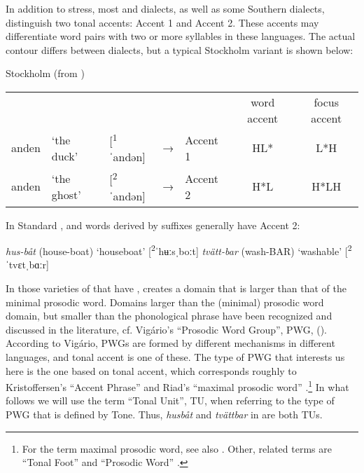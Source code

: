 \documentclass[output=paper]{LSP/langsci}
\begin{document}
In addition to stress, most  and  dialects, as well as some Southern  dialects, distinguish two tonal accents:  Accent 1 and Accent 2. These accents may differentiate word pairs with two or more syllables in these languages. The actual  contour differs between dialects, but a typical Stockholm variant is shown below:

\ea%
\label{ex:erteschik:3}
 Stockholm  (from \citealt[184]{Riad2013})\\
 \begin{tabular}[t]{lllllcc}
 & & & & &  word accent & focus accent\\
 anden & ‘the duck’  & [\textsuperscript{1}ˈandən]   & → & Accent 1 & HL*       &      L*H\\
 anden & ‘the ghost’ & [\textsuperscript{2}ˈandən]   & → & Accent 2 & H*L       &      H*LH\\ 
 \end{tabular}
\z

In Standard ,  and words derived by suffixes generally have Accent 2:

\ea%
\label{ex:erteschik:4}
\ea \label{ex:erteschik:4a} \textit{hus-båt} (house-boat) ‘houseboat’      [\textsuperscript{2}ˈhʉːsˌboːt]
\ex \label{ex:erteschik:4b} \textit{tvätt-bar} (wash-BAR) ‘washable’       [\textsuperscript{2}ˈtvɛtˌbɑːr]
\z
\z

In those varieties of  that have ,  creates a domain that is larger than that of the minimal prosodic word. Domains larger than the (minimal) prosodic word domain, but smaller than the phonological phrase have been recognized and discussed in the literature, cf. Vigário’s ``Prosodic Word Group'', PWG, (\citealt{Vigário2010}). According to Vigário, PWGs are formed by different mechanisms in different languages, and tonal accent is one of these. The type of PWG that interests us here is the one based on tonal accent, which corresponds roughly to Kristoffersen’s ``Accent Phrase'' \citep{Kristoffersen2000} and Riad’s ``maximal prosodic word'' \citep{Riad2013}.\footnote{For the term maximal prosodic word, see also  \citet{Myrberg2013}. Other, related terms are ``Tonal Foot'' \citep{Fretheim1989} and ``Prosodic Word'' \citep{Bruce1998,Hansson2003}.} In what follows we will use the term ``Tonal Unit'', TU, when referring to the type of PWG that is defined by Tone. Thus, \textit{husbåt} and \textit{tvättbar} in  are both TUs.    
\end{document}
